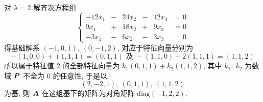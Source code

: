 \begin{solution}
    对 $\lambda=2$ 解齐次方程组
    $$\left\{\begin{matrix}
            -12x_1 & - & 24x_2 & - & 12x_3 & =0 \\
            9x_1   & + & 18x_2 & + & 9x_3  & =0 \\
            -3x_1  & - & 6x_2  & - & 3x_3  & =0
        \end{matrix}\right.$$
        得基础解系 $(-1,0,1),~(0,-1,2)$, 对应于特征向量分别为
        $$-(1,0,0)+(1,1,1)=(0,1,1)\text{ 及 }-(1,1,0)+2(1,1,1)=(1,1,2)$$
        所以属于特征值 2 的全部特征向量为 $k_1(0,1,1)+k_2(1,1,2)$, 其中 $k_1,~k_2$ 为数域 $\vb*{P}$ 不全为 0 的任意性, 
        于是以 $$(2,-2,1),~(0,1,1),~(1,1,2)$$ 为基, 则 $\vb*{A}$ 在这组基下的矩阵为对角矩阵 $\mathrm{diag}(-1,2,2).$
\end{solution}

